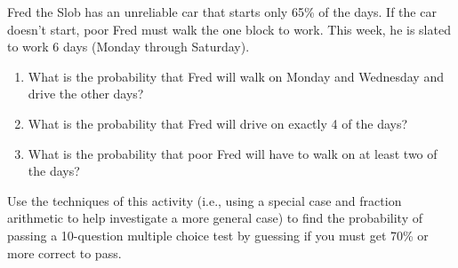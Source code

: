 \begin{prob} 
Fred the Slob has an unreliable car that starts only 65\% of the days.
If the car doesn't start, poor Fred must walk the one block to work.
This week, he is slated to work 6 days (Monday through Saturday).  
\begin{enumerate}
\item What is the probability that Fred will walk on Monday and Wednesday
and drive the other days?
\item What is the probability that Fred will
drive on exactly 4 of the days? 
\item What is the probability that poor Fred will have to walk on at least two of the days?
\end{enumerate}
\end{prob}

\begin{prob}
Use the techniques of this activity (i.e., using a special case and
fraction arithmetic to help investigate a more general case) to find
the probability of passing a 10-question multiple choice test by guessing if you
must get 70\% or more correct to pass.
\end{prob}
